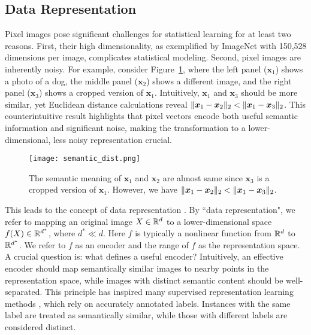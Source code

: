 \subsection{Data Representation}
Pixel images pose significant challenges for statistical learning for at least two reasons. First, their high dimensionality, as exemplified by ImageNet with 150,528 dimensions per image, complicates statistical modeling. Second, pixel images are inherently noisy. For example, consider Figure~\ref{fig:semantic_dist}, where the left panel ($\bm{x}_1$) shows a photo of a dog, the middle panel ($\bm{x}_2$) shows a different image, and the right panel ($\bm{x}_3$) shows a cropped version of $\bm{x}_1$. Intuitively, $\bm{x}_1$ and $\bm{x}_3$ should be more similar, yet Euclidean distance calculations reveal $\Vert{\bm{x}_1 - \bm{x}_2}\Vert_2 < \Vert{\bm{x}_1- \bm{x}_3}\Vert_2$. This counterintuitive result highlights that pixel vectors encode both useful semantic information and significant noise, making the transformation to a lower-dimensional, less noisy representation crucial.
\begin{figure}[h]
    \centering
    \texttt{[image: semantic\_dist.png]}
    \caption{The semantic meaning of $\bm{x}_1$ and $\bm{x}_2$ are almost same since $\bm{x}_3$ is a cropped version of $\bm{x}_1$. However, we have $\Vert{\bm{x}_1 - \bm{x}_2}\Vert_2 < \Vert{\bm{x}_1- \bm{x}_3}\Vert_2$.}
    \label{fig:semantic_dist}
\end{figure}

This leads to the concept of data representation \citep{rumelhart1986learning, Bengio2012unsupervised, lecun2015deep}. By ``data representation", we refer to mapping an original image $X\in \mathbb{R}^{d}$ to a lower-dimensional space $f(X) \in \mathbb{R}^{d^*}$, where $d^* \ll d$. Here $f$ is typically a nonlinear function from $\mathbb{R}^{d}$ to $\mathbb{R}^{d^*}$. We refer to $f$ as an encoder and the range of $f$ as the representation space. A crucial question is: what defines a useful encoder? Intuitively, an effective encoder should map semantically similar images to nearby points in the representation space, while images with distinct semantic content should be well-separated. This principle has inspired many supervised representation learning methods \citep{hoffer2015deep, chopra2005learning, zhai2018classification}, which rely on accurately annotated labels. Instances with the same label are treated as semantically similar, while those with different labels are considered distinct.

